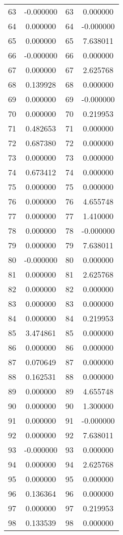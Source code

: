 \documentclass[12pt]{article}
\begin{document}
\begin{longtable}{@{}cccc@{}}
63 & -0.000000 & 63 & 0.000000 \\
64 & 0.000000 & 64 & -0.000000 \\
65 & 0.000000 & 65 & 7.638011 \\
66 & -0.000000 & 66 & 0.000000 \\
67 & 0.000000 & 67 & 2.625768 \\
68 & 0.139928 & 68 & 0.000000 \\
69 & 0.000000 & 69 & -0.000000 \\
70 & 0.000000 & 70 & 0.219953 \\
71 & 0.482653 & 71 & 0.000000 \\
72 & 0.687380 & 72 & 0.000000 \\
73 & 0.000000 & 73 & 0.000000 \\
74 & 0.673412 & 74 & 0.000000 \\
75 & 0.000000 & 75 & 0.000000 \\
76 & 0.000000 & 76 & 4.655748 \\
77 & 0.000000 & 77 & 1.410000 \\
78 & 0.000000 & 78 & -0.000000 \\
79 & 0.000000 & 79 & 7.638011 \\
80 & -0.000000 & 80 & 0.000000 \\
81 & 0.000000 & 81 & 2.625768 \\
82 & 0.000000 & 82 & 0.000000 \\
83 & 0.000000 & 83 & 0.000000 \\
84 & 0.000000 & 84 & 0.219953 \\
85 & 3.474861 & 85 & 0.000000 \\
86 & 0.000000 & 86 & 0.000000 \\
87 & 0.070649 & 87 & 0.000000 \\
88 & 0.162531 & 88 & 0.000000 \\
89 & 0.000000 & 89 & 4.655748 \\
90 & 0.000000 & 90 & 1.300000 \\
91 & 0.000000 & 91 & -0.000000 \\
92 & 0.000000 & 92 & 7.638011 \\
93 & -0.000000 & 93 & 0.000000 \\
94 & 0.000000 & 94 & 2.625768 \\
95 & 0.000000 & 95 & 0.000000 \\
96 & 0.136364 & 96 & 0.000000 \\
97 & 0.000000 & 97 & 0.219953 \\
98 & 0.133539 & 98 & 0.000000 \\

\end{longtable}
\end{document}
